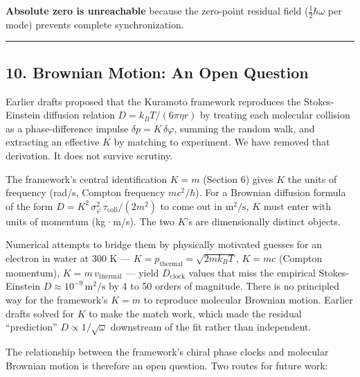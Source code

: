 \documentclass[
]{article}
\begin{document}
\textbf{Absolute zero is unreachable} because the zero-point residual
field (\(\frac{1}{2}\hbar\omega\) per mode) prevents complete
synchronization.

\begin{center}\rule{0.5\linewidth}{0.5pt}\end{center}

\subsection{10. Brownian Motion: An Open
Question}\label{brownian-motion-an-open-question}

Earlier drafts proposed that the Kuramoto framework reproduces the
Stokes-Einstein diffusion relation \(D = k_BT/(6\pi\eta r)\) by treating
each molecular collision as a phase-difference impulse
\(\delta p = K\,\delta\varphi\), summing the random walk, and extracting
an effective \(K\) by matching to experiment. We have removed that
derivation. It does not survive scrutiny.

The framework's central identification \(K = m\) (Section 6) gives \(K\)
the units of frequency (rad/s, Compton frequency \(mc^2/\hbar\)). For a
Brownian diffusion formula of the form
\(D = K^2\,\sigma_\varphi^2\,\tau_{\text{coll}}/(2m^2)\) to come out in
\(\mathrm{m}^2/\mathrm{s}\), \(K\) must enter with units of momentum
(kg·m/s). The two \(K\)'s are dimensionally distinct objects.

Numerical attempts to bridge them by physically motivated guesses for an
electron in water at 300 K ---
\(K = p_{\text{thermal}} = \sqrt{2 m k_B T}\), \(K = mc\) (Compton
momentum), \(K = m\,v_{\text{thermal}}\) --- yield \(D_{\text{clock}}\)
values that miss the empirical Stokes-Einstein
\(D \approx 10^{-9}\,\mathrm{m}^2/\mathrm{s}\) by 4 to 50 orders of
magnitude. There is no principled way for the framework's \(K = m\) to
reproduce molecular Brownian motion. Earlier drafts solved for \(K\) to
make the match work, which made the residual ``prediction''
\(D \propto 1/\sqrt{\omega}\) downstream of the fit rather than
independent.

The relationship between the framework's chiral phase clocks and
molecular Brownian motion is therefore an open question. Two routes for
future work:
\end{document}
